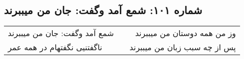 \begin{center}
\section*{شماره ۱۰۱: شمع آمد وگفت: جان من میببرند}
\label{sec:101}
\begin{longtable}{l p{0.5cm} r}
شمع آمد وگفت: جان من میببرند
&&
وز من همه دوستان من میببرند
\\
ناگفتنیی نگفتهام در همه عمر
&&
پس از چه سبب زبان من میببرند
\\
\end{longtable}
\end{center}
